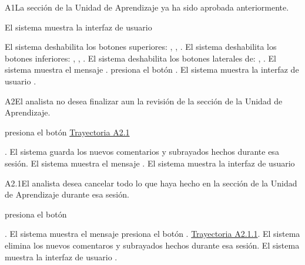 \begin{UCtrayectoriaA}{A1}{La sección de la Unidad de Aprendizaje ya ha sido aprobada anteriormente.}

	\hypertarget{SP2-CU5-A1}{\UCpaso El sistema muestra la interfaz de usuario }
    \UCpaso El sistema deshabilita los botones superiores: , , .
    \UCpaso El sistema deshabilita los botones inferiores: , , .
    \UCpaso El sistema deshabilita los botones laterales de: , .
    \UCpaso El sistema muestra el mensaje .
    \UCpaso[\UCactor] presiona el botón .
    \UCpaso El sistema muestra la interfaz de usuario .
    
\end{UCtrayectoriaA}

	
\begin{UCtrayectoriaA}{A2}{El analista no desea finalizar aun la revisión de la sección de la Unidad de Aprendizaje.}

    \hypertarget{SP2-CU5-A2}{\UCpaso[\UCactor] presiona el botón  \hyperlink{SP2-CU5-A2.1}{Trayectoria A2.1}}. 
    \UCpaso El sistema guarda los nuevos comentarios y subrayados hechos durante esa sesión.
    \UCpaso El sistema muestra el mensaje .
    \UCpaso El sistema muestra la interfaz de usuario 
\end{UCtrayectoriaA}

\begin{UCtrayectoriaA}{A2.1}{El analista desea cancelar todo lo que haya hecho en la sección de la Unidad de Aprendizaje durante esa sesión.}

	\hypertarget{SP2-CU5-A2.1}{\UCpaso[\UCactor] presiona el botón }. 
    \UCpaso El sistema muestra el mensaje 
    \UCpaso [\UCactor] presiona el botón . \hyperlink{SP2-CU5-A2.1.1}{Trayectoria A2.1.1}.
    \UCpaso El sistema elimina los nuevos comentaros y subrayados hechos durante esa sesión.
    \UCpaso El sistema muestra la interfaz de usuario .
\end{UCtrayectoriaA}
	
